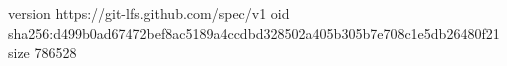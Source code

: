 version https://git-lfs.github.com/spec/v1
oid sha256:d499b0ad67472bef8ac5189a4ccdbd328502a405b305b7e708c1e5db26480f21
size 786528
